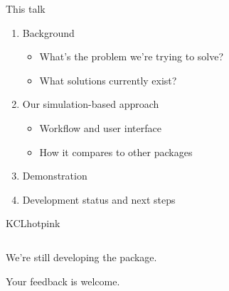 \documentclass[11pt]{beamer}
\newcommand{\bgap}{\vspace{0.8em}}
\begin{document}
\begin{frame}[t]{This talk}
	\large
	\begin{enumerate}
		\item Background
		      \begin{itemize}
			      \item What's the problem we're trying to solve?
			      \item What solutions currently exist?
		      \end{itemize}
		\item Our simulation-based approach
		      \begin{itemize}
			      \item Workflow and user interface
			      \item How it compares to other packages
		      \end{itemize}
		\item Demonstration
		\item Development status and next steps
	\end{enumerate}

	\bgap
	\centering
	\begin{cbox}{KCLhotpink}{}
		\begin{columns}
			\begin{column}[c]{0.6\textwidth}
				We're still developing the package.

				Your feedback is welcome.


\end{column}
\end{columns}
\end{cbox}
\end{frame}
\end{document}

